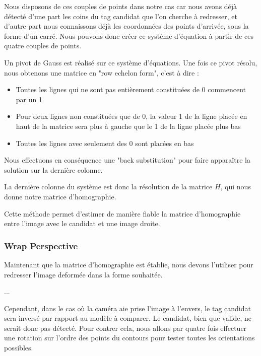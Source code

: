         Nous disposons de ces couples de points dans notre cas car nous avons déjà détecté d'une part les coins du tag candidat que l'on cherche à redresser, et d'autre part nous connaissons déjà les coordonnées des points d'arrivée, sous la forme d'un carré. Nous pouvons donc créer ce système d'équation à partir de ces quatre couples de points.

        Un pivot de Gauss est réalisé sur ce système d'équations. Une fois ce pivot résolu, nous obtenons une matrice en "row echelon form", c'est à dire :
    
        \begin{itemize}
            \item Toutes les lignes qui ne sont pas entièrement constituées de 0 commencent par un 1
            \item Pour deux lignes non constituées que de 0, la valeur 1 de la ligne placée en haut de la matrice sera plus à gauche que le 1 de la ligne placée plus bas
            \item Toutes les lignes avec seulement des 0 sont placées en bas
        \end{itemize}
    
        Nous effectuons en conséquence une "back substitution" pour faire apparaître la solution sur la dernière colonne.
    
        La dernière colonne du système est donc la résolution de la matrice $H$, qui nous donne notre matrice d'homographie.

        Cette méthode permet d'estimer de manière fiable la matrice d'homographie entre l'image avec le candidat et une image droite.

        
            \subsubsection{Wrap Perspective}

            Maintenant que la matrice d'homographie est établie, nous devons l'utiliser pour redresser l'image deformée dans la forme souhaitée.

            ... 

            Cependant, dans le cas où la caméra aie prise l'image à l'envers, le tag candidat sera inversé par rapport au modèle à comparer. Le candidat, bien que valide, ne serait donc pas détecté. Pour contrer cela, nous allons par quatre fois effectuer une rotation sur l'ordre des points du contours pour tester toutes les orientations possibles.


